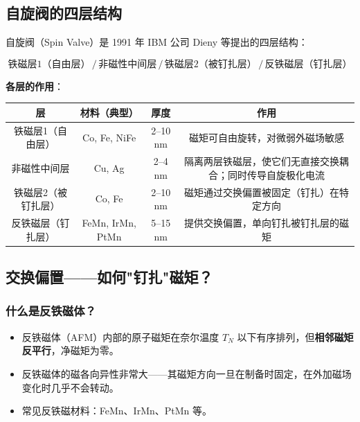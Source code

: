 \documentclass[12pt,a4paper]{article}
\begin{document}
\subsection{自旋阀的四层结构}
自旋阀（Spin Valve）是 1991 年 IBM 公司 Dieny 等提出的四层结构：

\begin{equation}
    \boxed{\text{铁磁层1（自由层）}\,/\,\text{非磁性中间层}\,/\,\text{铁磁层2（被钉扎层）}\,/\,\text{反铁磁层（钉扎层）}}
\end{equation}

\textbf{各层的作用}：

{\footnotesize
\begin{tabular}{|c|c|c|c|}
    \hline
    \textbf{层} & \textbf{材料（典型）} & \textbf{厚度} & \textbf{作用} \\
    \hline
    铁磁层1（自由层） & Co, Fe, NiFe & 2--10 nm & 磁矩可自由旋转，对微弱外磁场敏感 \\
    \hline
    非磁性中间层 & Cu, Ag & 2--4 nm & 隔离两层铁磁层，使它们无直接交换耦合；同时传导自旋极化电流 \\
    \hline
    铁磁层2（被钉扎层） & Co, Fe & 2--10 nm & 磁矩通过交换偏置被固定（钉扎）在特定方向 \\
    \hline
    反铁磁层（钉扎层） & FeMn, IrMn, PtMn & 5--15 nm & 提供交换偏置，单向钉扎被钉扎层的磁矩 \\
    \hline
\end{tabular}}

\subsection{交换偏置——如何"钉扎"磁矩？}

\subsubsection{什么是反铁磁体？}
\begin{itemize}
    \item 反铁磁体（AFM）内部的原子磁矩在奈尔温度 $T_N$ 以下有序排列，但\textbf{相邻磁矩反平行}，净磁矩为零。
    \item 反铁磁体的磁各向异性非常大——其磁矩方向一旦在制备时固定，在外加磁场变化时几乎不会转动。
    \item 常见反铁磁材料：FeMn、IrMn、PtMn 等。
\end{itemize}
\end{document}
